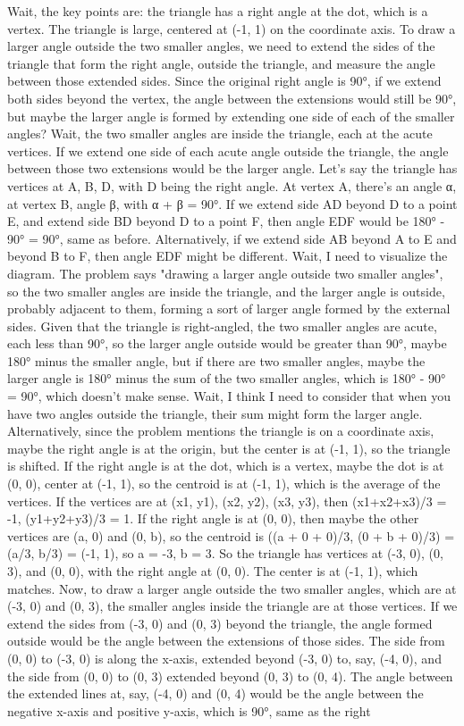 Wait, the key points are: the triangle has a right angle at the dot, which is a vertex. The triangle is large, centered at (-1, 1) on the coordinate axis. To draw a larger angle outside the two smaller angles, we need to extend the sides of the triangle that form the right angle, outside the triangle, and measure the angle between those extended sides. Since the original right angle is 90°, if we extend both sides beyond the vertex, the angle between the extensions would still be 90°, but maybe the larger angle is formed by extending one side of each of the smaller angles? Wait, the two smaller angles are inside the triangle, each at the acute vertices. If we extend one side of each acute angle outside the triangle, the angle between those two extensions would be the larger angle. Let's say the triangle has vertices at A, B, D, with D being the right angle. At vertex A, there's an angle α, at vertex B, angle β, with α + β = 90°. If we extend side AD beyond D to a point E, and extend side BD beyond D to a point F, then angle EDF would be 180° - 90° = 90°, same as before. Alternatively, if we extend side AB beyond A to E and beyond B to F, then angle EDF might be different. Wait, I need to visualize the diagram. The problem says "drawing a larger angle outside two smaller angles", so the two smaller angles are inside the triangle, and the larger angle is outside, probably adjacent to them, forming a sort of larger angle formed by the external sides. Given that the triangle is right-angled, the two smaller angles are acute, each less than 90°, so the larger angle outside would be greater than 90°, maybe 180° minus the smaller angle, but if there are two smaller angles, maybe the larger angle is 180° minus the sum of the two smaller angles, which is 180° - 90° = 90°, which doesn't make sense. Wait, I think I need to consider that when you have two angles outside the triangle, their sum might form the larger angle. Alternatively, since the problem mentions the triangle is on a coordinate axis, maybe the right angle is at the origin, but the center is at (-1, 1), so the triangle is shifted. If the right angle is at the dot, which is a vertex, maybe the dot is at (0, 0), center at (-1, 1), so the centroid is at (-1, 1), which is the average of the vertices. If the vertices are at (x1, y1), (x2, y2), (x3, y3), then (x1+x2+x3)/3 = -1, (y1+y2+y3)/3 = 1. If the right angle is at (0, 0), then maybe the other vertices are (a, 0) and (0, b), so the centroid is ((a + 0 + 0)/3, (0 + b + 0)/3) = (a/3, b/3) = (-1, 1), so a = -3, b = 3. So the triangle has vertices at (-3, 0), (0, 3), and (0, 0), with the right angle at (0, 0). The center is at (-1, 1), which matches. Now, to draw a larger angle outside the two smaller angles, which are at (-3, 0) and (0, 3), the smaller angles inside the triangle are at those vertices. If we extend the sides from (-3, 0) and (0, 3) beyond the triangle, the angle formed outside would be the angle between the extensions of those sides. The side from (0, 0) to (-3, 0) is along the x-axis, extended beyond (-3, 0) to, say, (-4, 0), and the side from (0, 0) to (0, 3) extended beyond (0, 3) to (0, 4). The angle between the extended lines at, say, (-4, 0) and (0, 4) would be the angle between the negative x-axis and positive y-axis, which is 90°, same as the right 